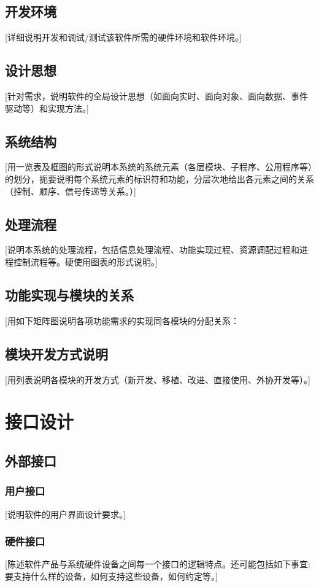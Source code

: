 \documentclass[10pt,a4paper,titlepage]{article} %
\begin{document}
\subsection{开发环境}
[详细说明开发和调试/测试该软件所需的硬件环境和软件环境。]\newline
\subsection{设计思想}
[针对需求，说明软件的全局设计思想（如面向实时、面向对象、面向数据、事件驱动等）和实现方法。]\newline
\subsection{系统结构}
[用一览表及框图的形式说明本系统的系统元素（各层模块、子程序、公用程序等）的划分，扼要说明每个系统元素的标识符和功能，分层次地给出各元素之间的关系（控制、顺序、信号传递等关系。）]\newline
\subsection{处理流程}
[说明本系统的处理流程，包括信息处理流程、功能实现过程、资源调配过程和进程控制流程等。硬使用图表的形式说明。] \newline
\subsection{功能实现与模块的关系}
[用如下矩阵图说明各项功能需求的实现同各模块的分配关系：\newline
\subsection{模块开发方式说明}
[用列表说明各模块的开发方式（新开发、移植、改进、直接使用、外协开发等）。]\newline
\section{接口设计}
\subsection{外部接口}
\subsubsection{用户接口}
[说明软件的用户界面设计要求。]
\subsubsection{硬件接口}
[陈述软件产品与系统硬件设备之间每一个接口的逻辑特点。还可能包括如下事宜: 要支持什么样的设备，如何支持这些设备，如何约定等。]
\end{document}
